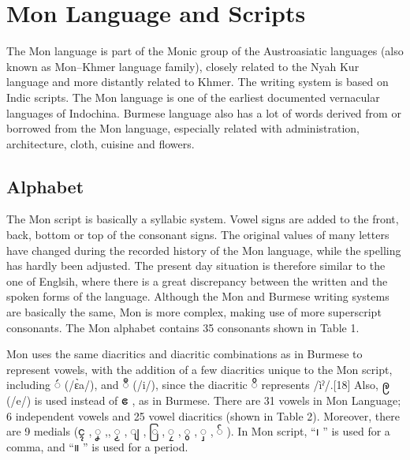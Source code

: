 \documentclass[conference]{IEEEtran}
\begin{document}
\section{Mon Language and Scripts}
\label{sec:Mon Language}
The Mon language is part of the Monic group of the Austroasiatic languages (also known as Mon–Khmer language family), closely related to the Nyah Kur language and more distantly related to Khmer. The writing system is based on Indic scripts. The Mon language is one of the earliest documented vernacular languages of Indochina. Burmese language also has a lot of words derived from or borrowed from the Mon language, especially related with administration, architecture, cloth, cuisine and flowers.

\subsection{Alphabet}
\label{subsec:Mon Alphabet}
The Mon script is basically a syllabic system. Vowel signs are added to the front, back, bottom or top of the consonant signs. The original values of many letters  have  changed  during  the  recorded history  of  the  Mon  language, while  the  spelling has hardly been adjusted. The present day situation is therefore similar to the one of Englsih, where there is a great discrepancy between the written and the spoken forms  of  the  language. Although the Mon and Burmese writing systems are basically the same, Mon is more complex,  making  use  of more superscript consonants. \cite{b4} The Mon alphabet contains 35 consonants shown in Table 1.
\par Mon uses the same diacritics and diacritic combinations as in Burmese to represent vowels, with the addition of a few diacritics unique to the Mon script, including {\padauktext ဴ }(/ɛ̀a/), and {\padauktext ဳ} (/i/), since the diacritic {\padauktext ိ} represents /ìˀ/.[18] Also, {\padauktext ဨ } (/e/) is used instead of {\padauktext ဧ }, as in Burmese. There are 31 vowels in Mon Language; 6 independent vowels and 25 vowel diacritics (shown in Table 2). Moreover, there are 9 medials ({\padauktext ၚ  }, {\padauktext ၞ  },, {\padauktext ၟ  }, {\padauktext ျ }, {\padauktext ြ }, {\padauktext ၠ  }, {\padauktext ွ  }, {\padauktext ှ  }, {\padauktext ်  }). In Mon script, ``{\padauktext ၊ }'' is used for a comma, and ``{\padauktext ။ }'' is used for a period.\cite{b5}
\end{document}
